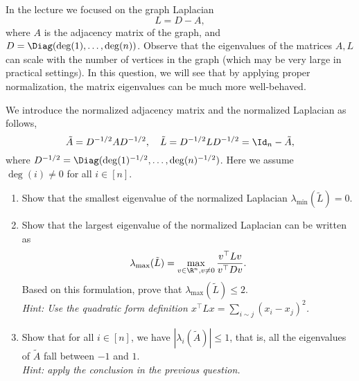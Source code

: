 \documentclass[11pt,nocut]{article}
\begin{document}
\vspace{2mm}


\begin{problem}[4 points] 

In the lecture we focused on the graph Laplacian
	$$
	L = D - A,
	$$
where $A$ is the adjacency matrix of the graph, and $D = \Diag(\deg(1), \dots, \deg(n))$. 
Observe that the eigenvalues of the matrices $A,L$ can scale with the number of vertices in the graph (which may be very large in practical settings). In this question, we will see that by applying proper normalization, the matrix eigenvalues can be much more well-behaved. 

We introduce the normalized adjacency matrix and the normalized Laplacian as follows,
	$$
	\tilde{A} = D^{-1/2} A D^{-1/2}, \quad \tilde{L} = D^{-1/2} L D^{-1/2} = \Id_n - \tilde{A},
	$$
	where $D^{-1/2} = \Diag(\deg(1)^{-1/2}, \dots, \deg(n)^{-1/2})$. Here we assume $\deg(i)\neq 0$ for all $i\in[n]$. 

\begin{enumerate}[label=\normalfont(\textbf{\alph*})]
  \item Show that the smallest eigenvalue of the normalized Laplacian $\lambda_{\min}(\tilde{L}) = 0$. 
  \item Show that the largest eigenvalue of the normalized Laplacian can be written as 
  $$\lambda_{\max}(\tilde{L}) = \max_{v\in\R^n, v\neq 0} \frac{v^\top L v}{v^\top D v}.$$ 
  Based on this formulation, prove that $\lambda_{\max}(\tilde{L}) \le 2$. \\
    \textit{Hint: Use the quadratic form definition $x^\top L x = \sum_{i\sim j}(x_i-x_j)^2$.}   
    \item Show that for all $i\in[n]$, we have $|\lambda_{i}(\tilde{A})|\le 1$, that is, all the eigenvalues of $\tilde{A}$ fall between $-1$ and $1$.  \\
    \textit{Hint: apply the conclusion in the previous question.}   
\end{enumerate}

\end{problem}

\vspace{2mm}
\end{document}
